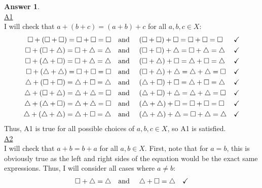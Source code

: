 \documentclass[10pt,a4paper]{article}
\theoremstyle{definition}
\newtheorem*{answer*}{Answer}
\begin{document}
\begin{answer*}{$ $}
\\\underline{A1}
\\I will check that $a + (b + c) = (a + b) + c$ for all $a,b,c \in X$:
\begin{align*}
\square + (\square + \square) = \square + \square = \square &\text{\quad and \quad } (\square + \square) + \square = \square + \square = \square &\checkmark\\
\square + (\square + \triangle) = \square + \triangle = \triangle &\text{\quad and \quad } (\square + \square) + \triangle = \square + \triangle = \triangle &\checkmark\\
\square + (\triangle + \square) = \square + \triangle = \triangle &\text{\quad and \quad } (\square + \triangle) + \square = \triangle + \square = \triangle &\checkmark\\
\square + (\triangle + \triangle) = \square + \square = \square &\text{\quad and \quad } (\square + \triangle) + \triangle = \triangle + \triangle = \square &\checkmark\\
\triangle + (\square + \square) = \triangle + \square = \triangle &\text{\quad and \quad } (\triangle + \square) + \square = \triangle + \square = \triangle &\checkmark\\
\triangle + (\square + \triangle) = \triangle + \triangle = \square &\text{\quad and \quad } (\triangle + \square) + \triangle = \triangle + \triangle = \square &\checkmark\\
\triangle + (\triangle + \square) = \triangle + \triangle = \square &\text{\quad and \quad } (\triangle + \triangle) + \square = \square + \square = \square &\checkmark\\
\triangle + (\triangle + \triangle) = \triangle + \square = \triangle &\text{\quad and \quad } (\triangle + \triangle) + \triangle = \square + \triangle = \triangle &\checkmark\\
\end{align*}
Thus, A1 is true for all possible choices of $a, b, c \in X$, so A1 is satisfied.
\\\underline{A2}
\\I will check that $a + b = b + a$ for all $a,b \in X$. First, note that for $a = b$, this is obviously true as the left and right sides of the equation would be the exact same expressions. Thus, I will consider all cases where $a \neq b$:
\begin{align*}
\square + \triangle = \triangle &\text{\quad and \quad} \triangle + \square = \triangle &\checkmark\\

\end{align*}
\end{answer*}
\end{document}
